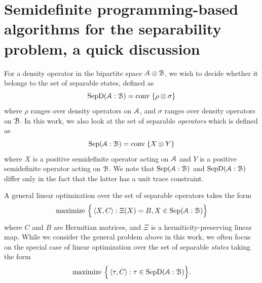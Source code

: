 \section{Semidefinite programming-based algorithms for the separability problem, a quick discussion}\label{sec:ch2_SEP-small_SEP} 

For a density operator in the bipartite space $\mathcal{A} \otimes \mathcal{B}$, we wish to decide whether it belongs to the set of separable states, defined as 
\begin{equation} 
\mathrm{SepD}(\mathcal{A}: \mathcal{B}) = \mathrm{conv} \; \{ \rho \otimes \sigma \} 
\label{eq:ch2_SEP-SepIntro}
\end{equation} 
where %
$\rho$ ranges over density operators on $\mathcal{A}$, and $\sigma$ ranges over density operators on $\mathcal{B}$.
In this work, we also look at the set of separable \emph{operators} which is  defined as  
\begin{equation} 
\mathrm{Sep}(\mathcal{A}: \mathcal{B}) = \mathrm{conv} \; \{ X \otimes Y \} 
\label{eq:ch2_SEP-Sep}
\end{equation} 
where $X$ is a positive semidefinite operator acting on $\mathcal{A}$ and $Y$ is a positive semidefinite operator acting on $\mathcal{B}$. 
We note that $\mathrm{Sep}(\mathcal{A}: \mathcal{B})$ and $\mathrm{SepD}(\mathcal{A}: \mathcal{B})$ differ only in the fact that the latter has a unit trace constraint. 

A general linear optimization over the set of separable operators takes the form 
\begin{equation} \label{eq:ch2_SEP-Sep_opt_operator} 
\text{maximize } \Big\{ \left\langle X, C \right\rangle : \Xi(X) = B, X \in \mathrm{Sep}(\mathcal{A}:\mathcal{B}) \Big\} 
\end{equation} 
where $C$ and $B$ are Hermitian matrices, and $\Xi$ is a hermiticity-preserving linear map.%
While we consider the general problem above in this work, we often focus on the special case of linear optimization over the set of separable \emph{states} taking the form 
\begin{equation} \label{eq:ch2_SEP-Sep_opt} 
\text{maximize } \Big\{ \left\langle \tau, C \right\rangle : \tau \in \mathrm{SepD}(\mathcal{A}:\mathcal{B}) \Big\}.  
\end{equation}

